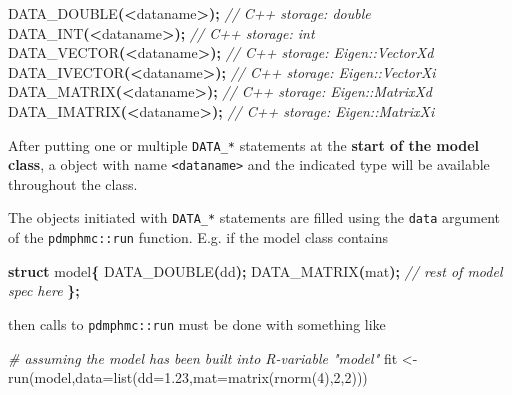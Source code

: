 \documentclass[
]{book}
\newenvironment{Shaded}{\begin{snugshade}}{\end{snugshade}}
\newcommand{\AttributeTok}[1]{\textcolor[rgb]{0.77,0.63,0.00}{#1}}
\newcommand{\CommentTok}[1]{\textcolor[rgb]{0.56,0.35,0.01}{\textit{#1}}}
\newcommand{\DecValTok}[1]{\textcolor[rgb]{0.00,0.00,0.81}{#1}}
\newcommand{\FloatTok}[1]{\textcolor[rgb]{0.00,0.00,0.81}{#1}}
\newcommand{\FunctionTok}[1]{\textcolor[rgb]{0.00,0.00,0.00}{#1}}
\newcommand{\KeywordTok}[1]{\textcolor[rgb]{0.13,0.29,0.53}{\textbf{#1}}}
\newcommand{\NormalTok}[1]{#1}
\newcommand{\OperatorTok}[1]{\textcolor[rgb]{0.81,0.36,0.00}{\textbf{#1}}}
\newcommand{\OtherTok}[1]{\textcolor[rgb]{0.56,0.35,0.01}{#1}}
\begin{document}
\begin{Shaded}
\begin{Highlighting}[]
\NormalTok{DATA\_DOUBLE}\OperatorTok{(\textless{}}\NormalTok{dataname}\OperatorTok{\textgreater{});} \CommentTok{// C++ storage: double }
\NormalTok{DATA\_INT}\OperatorTok{(\textless{}}\NormalTok{dataname}\OperatorTok{\textgreater{});} \CommentTok{// C++ storage: int }
\NormalTok{DATA\_VECTOR}\OperatorTok{(\textless{}}\NormalTok{dataname}\OperatorTok{\textgreater{});} \CommentTok{// C++ storage: Eigen::VectorXd }
\NormalTok{DATA\_IVECTOR}\OperatorTok{(\textless{}}\NormalTok{dataname}\OperatorTok{\textgreater{});} \CommentTok{// C++ storage: Eigen::VectorXi }
\NormalTok{DATA\_MATRIX}\OperatorTok{(\textless{}}\NormalTok{dataname}\OperatorTok{\textgreater{});} \CommentTok{// C++ storage: Eigen::MatrixXd }
\NormalTok{DATA\_IMATRIX}\OperatorTok{(\textless{}}\NormalTok{dataname}\OperatorTok{\textgreater{});} \CommentTok{// C++ storage: Eigen::MatrixXi }
\end{Highlighting}
\end{Shaded}

After putting one or multiple \texttt{DATA\_*} statements at the \textbf{start of the model class}, a object with name \texttt{\textless{}dataname\textgreater{}} and the indicated type will be available throughout the class.

The objects initiated with \texttt{DATA\_*} statements are filled using the \texttt{data} argument of the \texttt{pdmphmc::run} function. E.g. if the model class contains

\begin{Shaded}
\begin{Highlighting}[]
\KeywordTok{struct}\NormalTok{ model}\OperatorTok{\{}
\NormalTok{  DATA\_DOUBLE}\OperatorTok{(}\NormalTok{dd}\OperatorTok{);}
\NormalTok{  DATA\_MATRIX}\OperatorTok{(}\NormalTok{mat}\OperatorTok{);}
  \CommentTok{// rest of model spec here}
\OperatorTok{\};}
\end{Highlighting}
\end{Shaded}

then calls to \texttt{pdmphmc::run} must be done with
something like

\begin{Shaded}
\begin{Highlighting}[]
\CommentTok{\# assuming the model has been built into R{-}variable "model"}
\NormalTok{fit }\OtherTok{\textless{}{-}} \FunctionTok{run}\NormalTok{(model,}\AttributeTok{data=}\FunctionTok{list}\NormalTok{(}\AttributeTok{dd=}\FloatTok{1.23}\NormalTok{,}\AttributeTok{mat=}\FunctionTok{matrix}\NormalTok{(}\FunctionTok{rnorm}\NormalTok{(}\DecValTok{4}\NormalTok{),}\DecValTok{2}\NormalTok{,}\DecValTok{2}\NormalTok{)))}
\end{Highlighting}
\end{Shaded}
\end{document}
